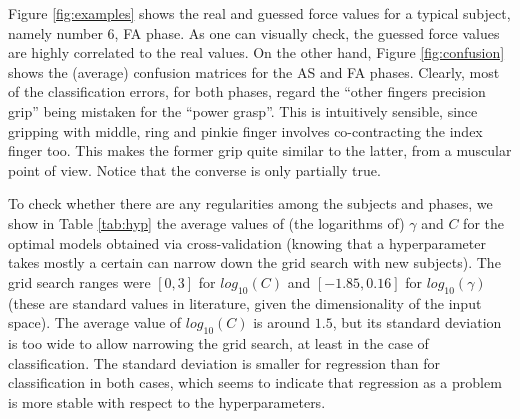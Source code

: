 \documentclass[10pt]{bmc_article}
\def\texttt{[image: ]}
\newenvironment{bmcformat}{\begin{raggedright}\baselineskip20pt\sloppy\setboolean{publ}{false}}{\end{raggedright}\baselineskip20pt\sloppy}
\begin{document}
\begin{bmcformat}
Figure \ref{fig:examples} shows the real and guessed force values for a
typical subject, namely number $6$, FA phase. As one can visually
check, the guessed force values are highly correlated to the real
values. On the other hand, Figure \ref{fig:confusion} shows the (average)
confusion matrices for the AS and FA phases. Clearly, most of the classification
errors, for both phases, regard the ``other fingers precision grip'' being
mistaken for the ``power grasp''. This is intuitively sensible, since gripping
with middle, ring and pinkie finger involves co-contracting the index finger too.
This makes the former grip quite similar to the latter, from a muscular point
of view. Notice that the converse is only partially true.



To check whether there are any regularities among the subjects and phases,
we show in Table \ref{tab:hyp} the average values of (the logarithms of)
$\gamma$ and $C$ for the optimal models obtained via cross-validation
(knowing that a hyperparameter takes mostly a certain can narrow down the
grid search with new subjects).
The grid search ranges were $[0,3]$ for $log_{10}(C)$ and
$[-1.85,0.16]$ for $log_{10}(\gamma)$ (these are standard values in
literature, given the dimensionality of the input space). The average value of
$log_{10}(C)$ is around $1.5$, but its standard deviation is too wide
to allow narrowing the grid search, at least in the case of
classification. The standard deviation is smaller for regression than
for classification in both cases, which seems to indicate that
regression as a problem is more stable with respect to the
hyperparameters.


\end{bmcformat}
\end{document}
